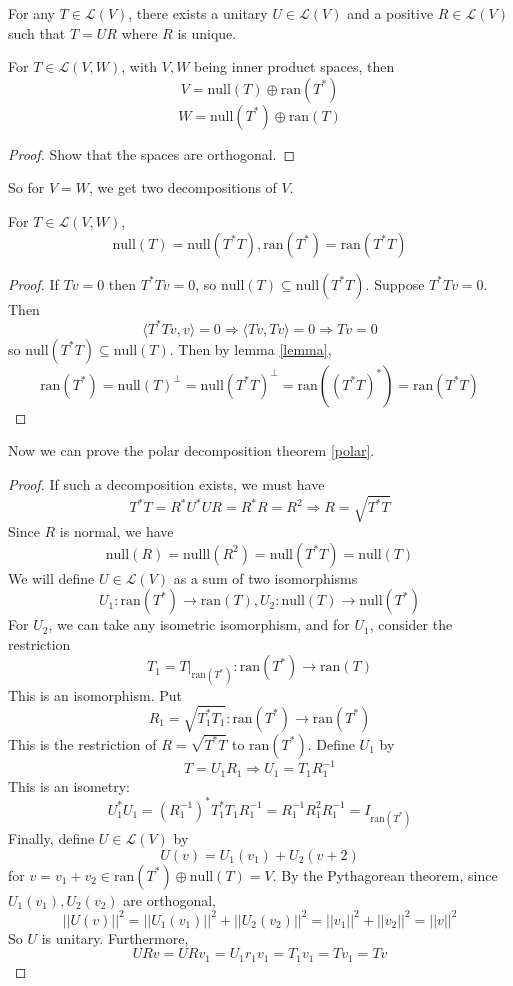 \documentclass[12pt]{article}
\begin{document}
\begin{thm}\label{polar}
	For any $T \in \mathcal L(V)$, there exists a unitary $U \in \mathcal L(V)$ and a positive $R \in \mathcal L(V)$ such that $T=UR$ where $R$ is unique.
\end{thm}

\begin{lem}\label{lemma}
	For $T \in \mathcal L(V,W)$, with $V,W$ being inner product spaces, then
	$$V = \text{null}(T) \oplus \text{ran}(T^*)$$
	$$W = \text{null}(T^*) \oplus \text{ran}(T)$$
\end{lem}

\begin{proof}
	Show that the spaces are orthogonal.
\end{proof}

So for $V=W$, we get two decompositions of $V$.

\begin{lem}
	For $T \in \mathcal L(V,W)$,
	$$\text{null}(T) = \text{null}(T^*T), \text{ran}(T^*) = \text{ran}(T^*T)$$
\end{lem}

\begin{proof}
	If $Tv=0$ then $T^*Tv=0$, so $\text{null}(T) \subseteq \text{null}(T^*T)$. Suppose $T^*Tv = 0$. Then
	$$\langle T^*Tv,v \rangle = 0 \Rightarrow \langle Tv,Tv \rangle = 0 \Rightarrow Tv = 0$$
	so $\text{null}(T^*T) \subseteq \text{null}(T)$. Then by lemma \ref{lemma},
	$$\text{ran}(T^*) = \text{null}(T)^\perp = \text{null}(T^*T)^\perp = \text{ran}((T^*T)^*) = \text{ran}(T^*T)$$
\end{proof}

Now we can prove the polar decomposition theorem \ref{polar}.
\begin{proof}
	If such a decomposition exists, we must have
	$$T^*T = R^*U^*UR = R^*R = R^2 \Rightarrow R = \sqrt{T^*T}$$
	Since $R$ is normal, we have
	$$\text{null}(R) = \text{nulll}(R^2) = \text{null}(T^*T) = \text{null}(T)$$
	We will define $U \in \mathcal L(V)$ as a sum of two isomorphisms
	$$U_1: \text{ran}(T^*) \rightarrow \text{ran}(T), U_2: \text{null}(T) \rightarrow \text{null}(T^*)$$
	For $U_2$, we can take any isometric isomorphism, and for $U_1$, consider the restriction
	$$T_1 = T|_{\text{ran}(T^*)}:\text{ran}(T^*) \rightarrow \text{ran}(T)$$
	This is an isomorphism. Put
	$$R_1 = \sqrt{T_1^*T_1}: \text{ran}(T^*) \rightarrow \text{ran}(T^*)$$
	This is the restriction of $R = \sqrt{T^*T}$ to $\text{ran}(T^*)$. Define $U_1$ by
	$$T = U_1R_1 \Rightarrow U_1 = T_1R_1^{-1}$$
	This is an isometry:
	$$U_1^*U_1 = (R_1^{-1})^*T_1^*T_1R_1^{-1} = R_1^{-1}R_1^2R_1^{-1} = I_{\text{ran}(T^*)}$$
	Finally, define $U \in \mathcal L(V)$ by
	$$U(v) = U_1(v_1) + U_2(v+2)$$
	for $v = v_1 + v_2 \in \text{ran}(T^*) \oplus \text{null}(T) = V$. By the Pythagorean theorem, since $U_1(v_1), U_2(v_2)$ are orthogonal,
	$$||U(v)||^2 = ||U_1(v_1)||^2 + ||U_2(v_2)||^2 = ||v_1||^2 + ||v_2||^2 = ||v||^2$$
	So $U$ is unitary. Furthermore,
	$$URv = URv_1 = U_1r_1v_1 = T_1v_1 = Tv_1 = Tv$$
\end{proof}
\end{document}
